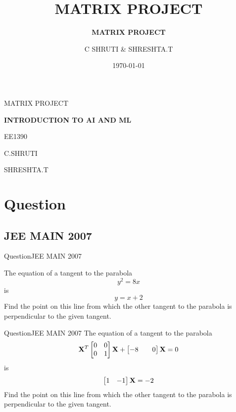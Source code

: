 \documentclass[10pt]{beamer}
\title[] %
{ %
      \textbf{\bf MATRIX PROJECT}
}
\subtitle[MATRIX PROJECT]
{
      \textbf{MATRIX PROJECT}
}
\author[C SHRUTI \& SHRESHTA.T]
{      C SHRUTI \& SHRESHTA.T \\
      {}
}
\institute[]
{
     IIT HYDERABAD
  
}
\date{\today}
\begin{document}

{\1%



\begin{frame}{MATRIX PROJECT}{}


{\bf INTRODUCTION TO AI AND ML}
\newline

EE1390
\newline

\bullet C.SHRUTI 
\newline

\bullet SHRESHTA.T \end{frame}

\section{Question}
\subsection{JEE MAIN 2007}
\begin{frame}{Question}{JEE MAIN 2007}

   The equation of a tangent to the parabola 
   \begin{equation}
       y^2=8x
   \end{equation}  
   is 
   \begin{equation}
    y=x+2   
   \end{equation}Find the point on this line from which the other tangent to the parabola is perpendicular to the given tangent. 
    
  
\end{frame}
\begin{frame}{Question}{JEE MAIN 2007}
The equation of a tangent to the parabola
\begin{equation}
{\bf X}^T
\begin{bmatrix}
0 & 0\\
0 & 1
\end{bmatrix}    
{\bf X}+\begin{bmatrix}
-8&&0\\
\end{bmatrix}
{\bf X}=0
\end{equation}
is 
\begin{equation}
\begin{bmatrix}
1 & -1
\end{bmatrix}
{\bf X}=-2
\end{equation}
Find the point on this line from which the other tangent to the parabola is perpendicular to the given tangent.
\end{frame}

}
\end{document}
